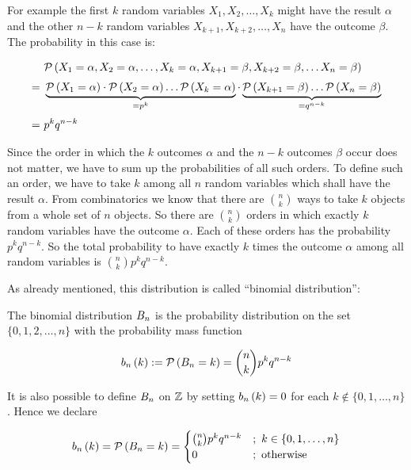 For example the first $k$ random variables $X_1,X_2,\ldots,X_k$ might have the result $\alpha$ and the other $n-k$ random variables $X_{k+1},X_{k+2},\ldots,X_n$ have the outcome $\beta$. The probability in this case is:

\begin{align}
  & \P{X_1=\alpha, X_2=\alpha, \ldots, X_k=\alpha,X_{k+1}=\beta, X_{k+2}=\beta, \ldots X_n =\beta} \nl
  =\ & \underbrace{\P{X_1=\alpha} \cdot \P{ X_2=\alpha} \ldots \P{X_k=\alpha}}_{=p^k} \cdot \underbrace{\P{X_{k+1}=\beta} \ldots \P{X_n =\beta}}_{= q^{n-k}} \nl
  =\ & p^kq^{n-k}
\end{align}

Since the order in which the $k$ outcomes $\alpha$ and the $n-k$ outcomes $\beta$ occur does not matter, we have to sum up the probabilities of all such orders. To define such an order, we have to take $k$ among all $n$ random variables which shall have the result $\alpha$. From combinatorics we know that there are $\binom nk$ ways to take $k$ objects from a whole set of $n$ objects. So there are $\binom nk$ orders in which exactly $k$ random variables have the outcome $\alpha$. Each of these orders has the probability $p^kq^{n-k}$. So the total probability to have exactly $k$ times the outcome $\alpha$ among all random variables is $\binom nk p^kq^{n-k}$.

As already mentioned, this distribution is called ``binomial distribution'':

\begin{definition}
  The binomial distribution $B_{n}$ is the probability distribution on the set $\{0,1,2,\ldots,n\}$ with the probability mass function

  \begin{align}
      b_{n}\left({k}\right):=\mathcal P\left({B_{n}=k}\right) = \binom nk p^k q^{n-k}
  \end{align}
\end{definition}

It is also possible to define $B_{n}$ on $\mathbb Z$ by setting $b_{n}\left({k}\right)=0$ for each $k\notin \{0,1,\ldots,n\}$. Hence we declare

\begin{align}
\b[n]{k} = \P{\Bs[n] = k} = \begin{cases} \binom nk p^k q^{n-k} & ;\ k \in \{0,1,\ldots,n\} \\ 0 & ;\  \text{otherwise} \end{cases}
\end{align}


